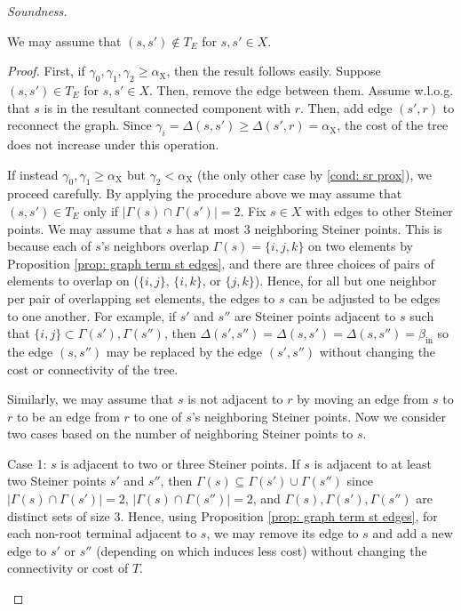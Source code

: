 \documentclass{theoretics}
\newcommand{\1}{\textbf{1}}
\newcommand{\srd}{\alpha_{\text{X}}}
\begin{document}
\begin{paragraph}{\textit{Soundness.}}
 
 
 \begin{lemma} \label{lem: graph st to st}
 We may assume that $(s, s') \not\in T_E$ for $s, s' \in X$.
 \end{lemma}
 \begin{proof}
  First, if $\gamma_0, \gamma_1, \gamma_2 \geq \srd$, then the result follows easily. Suppose $(s,s') \in T_E$ for $s, s' \in X$. Then, remove the edge between them. Assume w.l.o.g. that $s$ is in the resultant connected component with $r$. Then, add edge $(s', r)$ to reconnect the graph. Since $\gamma_i = \Delta(s,s') \geq \Delta(s', r) = \srd$, the cost of the tree does not increase under this operation.
  
  If instead $\gamma_0, \gamma_1 \geq \srd$ but $\gamma_2 < \srd$ (the only other case by \ref{cond: sr prox}), we proceed carefully. By applying the procedure above we may assume that $(s,s') \in T_E$ only if $|\Gamma(s) \cap \Gamma(s')| = 2$. Fix $s \in X$ with edges to other Steiner points. We may assume that $s$ has at most $3$ neighboring Steiner points. This is because each of $s$'s neighbors overlap $\Gamma(s) = \{i,j,k\}$ on two elements by Proposition \ref{prop: graph term st edges}, and there are three choices of pairs of elements to overlap on ($\{i,j\}$, $\{i,k\}$, or $\{j,k\}$). Hence, for all but one neighbor per pair of overlapping set elements, the edges to $s$ can be adjusted to be edges to one another. For example, if $s'$ and $s''$ are Steiner points adjacent to $s$ such that $\{i,j\} \subset \Gamma(s'), \Gamma(s'')$, then $\Delta(s', s'') = \Delta(s, s') = \Delta(s, s'') = \beta_{\text{in}}$ so the edge $(s, s'')$ may be replaced by the edge $(s', s'')$ without changing the cost or connectivity of the tree.
  
  Similarly, we may assume that $s$ is not adjacent to $r$ by moving an edge from $s$ to $r$ to be an edge from $r$ to one of $s$'s neighboring Steiner points. Now we consider two cases based on the number of neighboring Steiner points to $s$.
  
  
  \begin{paragraph}{Case 1: $s$ is adjacent to two or three Steiner points.}
  If $s$ is adjacent to at least two Steiner points $s'$ and $s''$, then $\Gamma(s) \subseteq \Gamma(s') \cup \Gamma(s'')$ since $|\Gamma(s) \cap \Gamma(s')| = 2$, $|\Gamma(s) \cap \Gamma(s'')| = 2$, and $\Gamma(s),\Gamma(s'),\Gamma(s'')$ are distinct sets of size $3$. Hence, using Proposition \ref{prop: graph term st edges}, for each non-root terminal adjacent to $s$, we may remove its edge to $s$ and add a new edge to $s'$ or $s''$ (depending on which induces less cost) without changing the connectivity or cost of $T$.
  

\end{paragraph}
\end{proof}
\end{paragraph}
\end{document}
